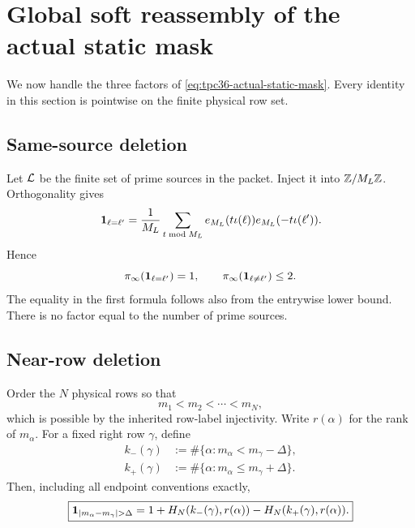 \section{Global soft reassembly of the actual static mask}
\label{sec:tpc36-global-mask}

We now handle the three factors of
\eqref{eq:tpc36-actual-static-mask}.  Every identity in this section is
pointwise on the finite physical row set.

\subsection{Same-source deletion}

Let \(\mathcal L\) be the finite set of prime sources in the packet.  Inject it
into \(\mathbb Z/M_L\mathbb Z\).  Orthogonality gives
\begin{equation}
 \mathbf 1_{\ell=\ell'}
 =\frac1{M_L}\sum_{t\bmod M_L}
 e_{M_L}(t\iota(\ell))e_{M_L}(-t\iota(\ell')).
 \label{eq:tpc36-source-equality}
\end{equation}
Hence
\begin{equation}
 \pi_{\infty}(\mathbf 1_{\ell=\ell'})=1,
 \qquad
 \pi_{\infty}(\mathbf 1_{\ell\ne\ell'})\le2.
 \label{eq:tpc36-source-cost}
\end{equation}
The equality in the first formula follows also from the entrywise lower
bound.  There is no factor equal to the number of prime sources.

\subsection{Near-row deletion}

Order the \(N\) physical rows so that
\begin{equation}
 m_1<m_2<\cdots<m_N,
 \label{eq:tpc36-row-order}
\end{equation}
which is possible by the inherited row-label injectivity.  Write
\(r(\alpha)\) for the rank of \(m_\alpha\).  For a fixed right row
\(\gamma\), define
\begin{align}
 k_-(\gamma)
 &:=\#\{\alpha:m_\alpha<m_\gamma-\Delta\},
 \label{eq:tpc36-lower-rank}\\
 k_+(\gamma)
 &:=\#\{\alpha:m_\alpha\le m_\gamma+\Delta\}.
 \label{eq:tpc36-upper-rank}
\end{align}
Then, including all endpoint conventions exactly,
\begin{equation}
 \boxed{
 \one_{|m_\alpha-m_\gamma|>\Delta}
 =1+H_N(k_-(\gamma),r(\alpha))
    -H_N(k_+(\gamma),r(\alpha)).}
 \label{eq:tpc36-near-row-prefix}
\end{equation}

